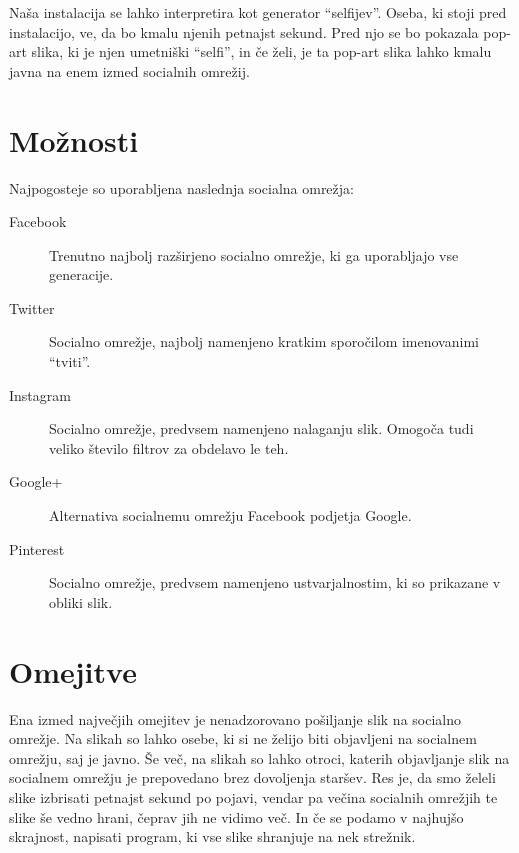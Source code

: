 Naša instalacija se lahko interpretira kot generator ``selfijev''. Oseba, ki stoji pred
instalacijo, ve, da bo kmalu njenih petnajst sekund. Pred njo se bo pokazala
pop-art slika, ki je njen umetniški ``selfi'', in če želi, je ta pop-art slika
lahko kmalu javna na enem izmed socialnih omrežij.


\section{Možnosti}
Najpogosteje so uporabljena naslednja socialna omrežja:
\begin{description}
\item[Facebook] Trenutno najbolj razširjeno socialno omrežje, ki ga uporabljajo vse generacije.
\item[Twitter] Socialno omrežje, najbolj namenjeno kratkim sporočilom imenovanimi ``tviti''.
\item[Instagram] Socialno omrežje, predvsem namenjeno nalaganju slik. Omogoča tudi veliko število filtrov za obdelavo le teh.
\item[Google+] Alternativa socialnemu omrežju Facebook podjetja Google.
\item[Pinterest] Socialno omrežje, predvsem namenjeno ustvarjalnostim, ki so prikazane v obliki slik.
\end{description}


\section{Omejitve}
Ena izmed največjih omejitev je nenadzorovano pošiljanje slik na socialno
omrežje. Na slikah so lahko osebe, ki si ne želijo biti objavljeni na
socialnem omrežju, saj je javno. Še več, na slikah so lahko otroci, katerih
objavljanje slik na socialnem omrežju je prepovedano brez dovoljenja staršev.
Res je, da smo želeli slike izbrisati petnajst sekund po pojavi, vendar pa
večina socialnih omrežjih te slike še vedno hrani, čeprav jih ne vidimo več.
In če se podamo v najhujšo skrajnost, napisati program, ki vse slike shranjuje
na nek strežnik.



